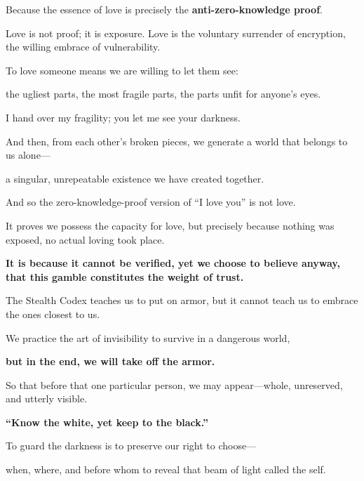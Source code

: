 Because the essence of love is precisely the \textbf{anti-zero-knowledge proof}.

Love is not proof; it is exposure. Love is the voluntary surrender of encryption, the willing embrace of vulnerability.

To love someone means we are willing to let them see:

the ugliest parts, the most fragile parts, the parts unfit for anyone's eyes.

I hand over my fragility; you let me see your darkness.

And then, from each other's broken pieces, we generate a world that belongs to us alone---

a singular, unrepeatable existence we have created together.

\vspace{1em}

And so the zero-knowledge-proof version of ``I love you'' is not love.

It proves we possess the capacity for love, but precisely because nothing was exposed, no actual loving took place.

\textbf{It is because it cannot be verified, yet we choose to believe anyway, that this gamble constitutes the weight of trust.}

\vspace{1em}

The Stealth Codex teaches us to put on armor, but it cannot teach us to embrace the ones closest to us.

We practice the art of invisibility to survive in a dangerous world,

\textbf{but in the end, we will take off the armor.}

So that before that one particular person, we may appear---whole, unreserved, and utterly visible.

\textbf{``Know the white, yet keep to the black.''}

\begin{importantbox}
To guard the darkness is to preserve our right to choose---

when, where, and before whom to reveal that beam of light called the self.
\end{importantbox}
